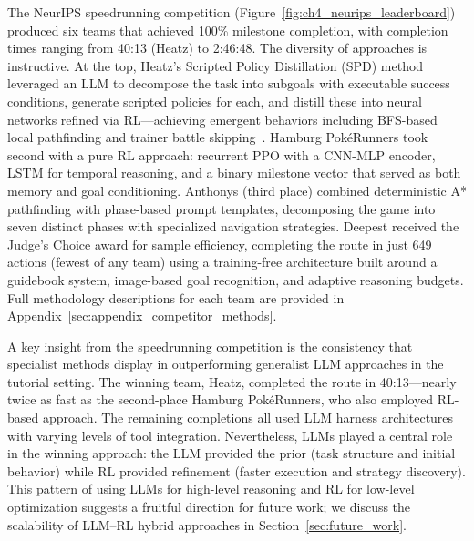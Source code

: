 The NeurIPS speedrunning competition (Figure~\ref{fig:ch4_neurips_leaderboard}) produced six teams that achieved 100\% milestone completion, with completion times ranging from 40:13 (Heatz) to 2:46:48. The diversity of approaches is instructive. At the top, Heatz's Scripted Policy Distillation (SPD) method leveraged an LLM to decompose the task into subgoals with executable success conditions, generate scripted policies for each, and distill these into neural networks refined via RL---achieving emergent behaviors including BFS-based local pathfinding and trainer battle skipping~\citep{karten2025pokeagent}. Hamburg Pok\'{e}Runners took second with a pure RL approach: recurrent PPO with a CNN-MLP encoder, LSTM for temporal reasoning, and a binary milestone vector that served as both memory and goal conditioning. Anthonys (third place) combined deterministic A* pathfinding with phase-based prompt templates, decomposing the game into seven distinct phases with specialized navigation strategies. Deepest received the Judge's Choice award for sample efficiency, completing the route in just 649 actions (fewest of any team) using a training-free architecture built around a guidebook system, image-based goal recognition, and adaptive reasoning budgets. Full methodology descriptions for each team are provided in Appendix~\ref{sec:appendix_competitor_methods}.


A key insight from the speedrunning competition is the consistency that specialist methods display in outperforming generalist LLM approaches in the tutorial setting. The winning team, Heatz, completed the route in 40:13---nearly twice as fast as the second-place Hamburg Pok\'{e}Runners, who also employed RL-based approach. The remaining completions all used LLM harness architectures with varying levels of tool integration. Nevertheless, LLMs played a central role in the winning approach: the LLM provided the prior (task structure and initial behavior) while RL provided refinement (faster execution and strategy discovery). This pattern of using LLMs for high-level reasoning and RL for low-level optimization suggests a fruitful direction for future work; we discuss the scalability of LLM--RL hybrid approaches in Section~\ref{sec:future_work}.

